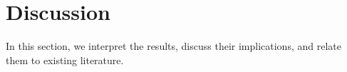 \section{Discussion}
\label{sec:discussion}

In this section, we interpret the results, discuss their implications, and relate them to existing literature.
